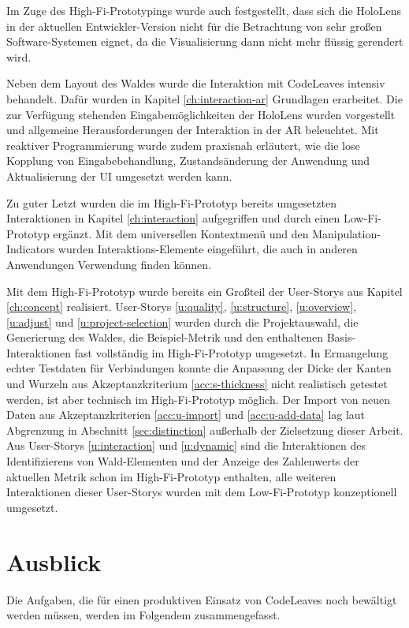 Im Zuge des High-Fi-Prototypings wurde auch festgestellt, dass sich die HoloLens in der aktuellen Entwickler-Version nicht für die Betrachtung von sehr großen Software-Systemen eignet, da die Visualisierung dann nicht mehr flüssig gerendert wird.

Neben dem Layout des Waldes wurde die Interaktion mit CodeLeaves intensiv behandelt. Dafür wurden in Kapitel \ref{ch:interaction-ar} Grundlagen erarbeitet. Die zur Verfügung stehenden Eingabemöglichkeiten der HoloLens wurden vorgestellt und allgemeine Herausforderungen der Interaktion in der AR beleuchtet. Mit reaktiver Programmierung wurde zudem praxisnah erläutert, wie die lose Kopplung von Eingabebehandlung, Zustandsänderung der Anwendung und Aktualisierung der UI umgesetzt werden kann.

Zu guter Letzt wurden die im High-Fi-Prototyp bereits umgesetzten Interaktionen in Kapitel \ref{ch:interaction} aufgegriffen und durch einen Low-Fi-Prototyp ergänzt. Mit dem universellen Kontextmenü und den Manipulation-Indicators wurden Interaktions-Elemente eingeführt, die auch in anderen Anwendungen Verwendung finden können.

Mit dem High-Fi-Prototyp wurde bereits ein Großteil der User-Storys aus Kapitel \ref{ch:concept} realisiert. User-Storys \ref{u:quality}, \ref{u:structure}, \ref{u:overview}, \ref{u:adjust} und \ref{u:project-selection} wurden durch die Projektauswahl, die Generierung des Waldes, die Beispiel-Metrik und den enthaltenen Basis-Interaktionen fast vollständig im High-Fi-Prototyp umgesetzt. In Ermangelung echter Testdaten für Verbindungen konnte die Anpassung der Dicke der Kanten und Wurzeln aus Akzeptanzkriterium \ref{acc:s-thickness} nicht realistisch getestet werden, ist aber technisch im High-Fi-Prototyp möglich. Der Import von neuen Daten aus Akzeptanzkriterien \ref{acc:u-import} und \ref{acc:u-add-data} lag laut Abgrenzung in Abschnitt \ref{sec:distinction} außerhalb der Zielsetzung dieser Arbeit. Aus User-Storys \ref{u:interaction} und \ref{u:dynamic} sind die Interaktionen des Identifizierens von Wald-Elementen und der Anzeige des Zahlenwerts der aktuellen Metrik schon im High-Fi-Prototyp enthalten, alle weiteren Interaktionen dieser User-Storys wurden mit dem Low-Fi-Prototyp konzeptionell umgesetzt.

\section{Ausblick}

Die Aufgaben, die für einen produktiven Einsatz von CodeLeaves noch bewältigt werden müssen, werden im Folgendem zusammengefasst.

